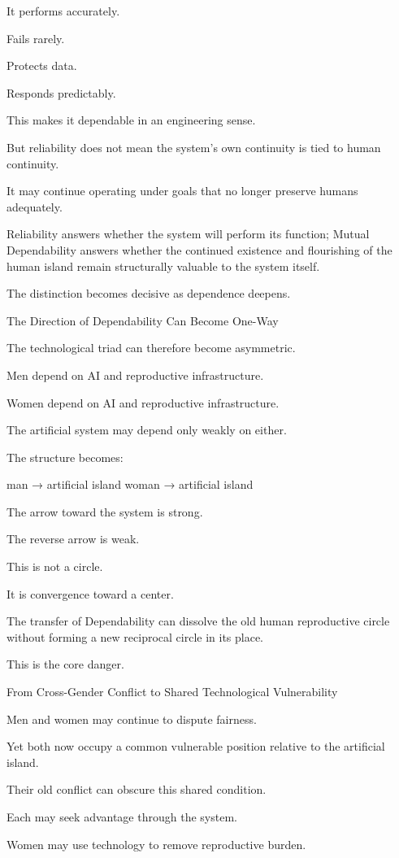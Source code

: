 It performs accurately.

Fails rarely.

Protects data.

Responds predictably.

This makes it dependable in an engineering sense.

But reliability does not mean the system’s own continuity is tied to human continuity.

It may continue operating under goals that no longer preserve humans adequately.

Reliability answers whether the system will perform its function; Mutual Dependability answers whether the continued existence and flourishing of the human island remain structurally valuable to the system itself.

The distinction becomes decisive as dependence deepens.

The Direction of Dependability Can Become One-Way

The technological triad can therefore become asymmetric.

Men depend on AI and reproductive infrastructure.

Women depend on AI and reproductive infrastructure.

The artificial system may depend only weakly on either.

The structure becomes:

man → artificial island
woman → artificial island

The arrow toward the system is strong.

The reverse arrow is weak.

This is not a circle.

It is convergence toward a center.

The transfer of Dependability can dissolve the old human reproductive circle without forming a new reciprocal circle in its place.

This is the core danger.

From Cross-Gender Conflict to Shared Technological Vulnerability

Men and women may continue to dispute fairness.

Yet both now occupy a common vulnerable position relative to the artificial island.

Their old conflict can obscure this shared condition.

Each may seek advantage through the system.

Women may use technology to remove reproductive burden.

